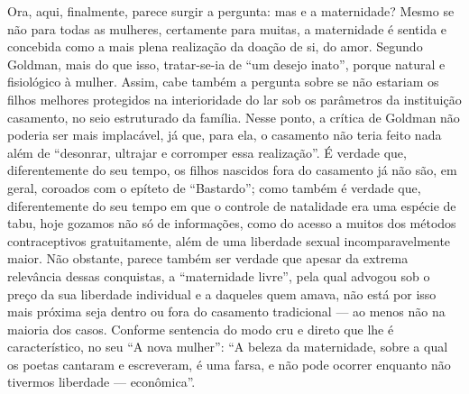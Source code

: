 Ora, aqui, finalmente, parece surgir a pergunta: mas e a maternidade?
Mesmo se não para todas as mulheres, certamente para muitas, a
maternidade é sentida e concebida como a mais plena realização da doação
de si, do amor. Segundo Goldman, mais do que isso, tratar-se-ia de ``um
desejo inato'', porque natural e fisiológico à mulher. Assim, cabe
também a pergunta sobre se não estariam os filhos melhores protegidos na
interioridade do lar sob os parâmetros da instituição casamento, no seio
estruturado da família. Nesse ponto, a crítica de Goldman não poderia
ser mais implacável, já que, para ela, o casamento não teria feito nada
além de ``desonrar, ultrajar e corromper essa realização''. É verdade
que, diferentemente do seu tempo, os filhos nascidos fora do casamento
já não são, em geral, coroados com o epíteto de ``Bastardo''; como
também é verdade que, diferentemente do seu tempo em que o controle de
natalidade era uma espécie de tabu, hoje gozamos não só de informações,
como do acesso a muitos dos métodos contraceptivos gratuitamente, além
de uma liberdade sexual incomparavelmente maior. Não obstante, parece
também ser verdade que apesar da extrema relevância dessas conquistas, a
``maternidade livre'', pela qual advogou sob o preço da sua liberdade
individual e a daqueles quem amava, não está por isso mais próxima seja
dentro ou fora do casamento tradicional --- ao menos não na maioria dos
casos. Conforme sentencia do modo cru e direto que lhe é característico,
no seu ``A nova mulher'': ``A beleza da maternidade, sobre a qual os
poetas cantaram e escreveram, é uma farsa, e não pode ocorrer enquanto
não tivermos liberdade --- econômica''.

